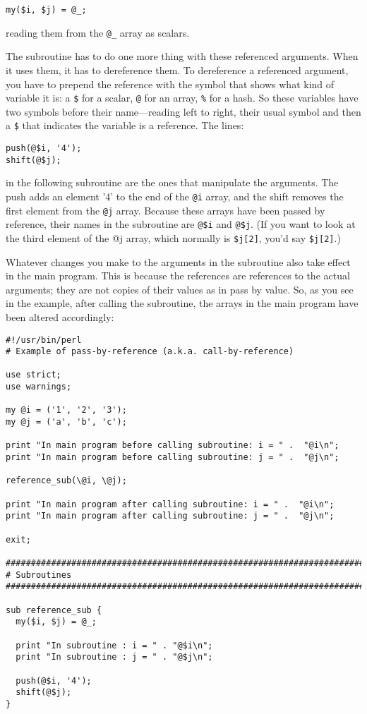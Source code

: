 \begin{lstlisting}
my($i, $j) = @_;
\end{lstlisting}

reading them from the \verb|@_| array as scalars.

The subroutine has to do one more thing with these referenced arguments.  When it uses them, it has to dereference them. To dereference a referenced argument, you have to prepend the reference with the symbol that shows what kind of variable it is: a \verb|$| for a scalar, \verb|@| for an array, \verb|%| for a hash. So these variables have two symbols before their name—reading left to right, their usual symbol and then a \verb|$| that indicates the variable is a reference. The lines:

\begin{lstlisting}
push(@$i, '4');
shift(@$j);
\end{lstlisting}

in the following subroutine are the ones that manipulate the arguments.  The push adds an element '4' to the end of the \verb|@i| array, and the shift removes the first element from the \verb|@j| array. Because these arrays have been passed by reference, their names in the subroutine are \verb|@$i| and \verb|@$j|.  (If you want to look at the third element of the @j array, which normally is \verb|$j[2]|, you'd say \verb|$j[2]|.)

Whatever changes you make to the arguments in the subroutine also take effect in the main program. This is because the references are references to the actual arguments; they are not copies of their values as in pass by value. So, as you see in the example, after calling the subroutine, the arrays in the main program have been altered accordingly:

\begin{lstlisting}
#!/usr/bin/perl
# Example of pass-by-reference (a.k.a. call-by-reference)

use strict;
use warnings;

my @i = ('1', '2', '3');
my @j = ('a', 'b', 'c');

print "In main program before calling subroutine: i = " .  "@i\n";
print "In main program before calling subroutine: j = " .  "@j\n";

reference_sub(\@i, \@j);

print "In main program after calling subroutine: i = " .  "@i\n";
print "In main program after calling subroutine: j = " .  "@j\n";

exit;

################################################################################
# Subroutines
################################################################################

sub reference_sub {
  my($i, $j) = @_;

  print "In subroutine : i = " . "@$i\n";
  print "In subroutine : j = " . "@$j\n";

  push(@$i, '4');
  shift(@$j);
}
\end{lstlisting}

